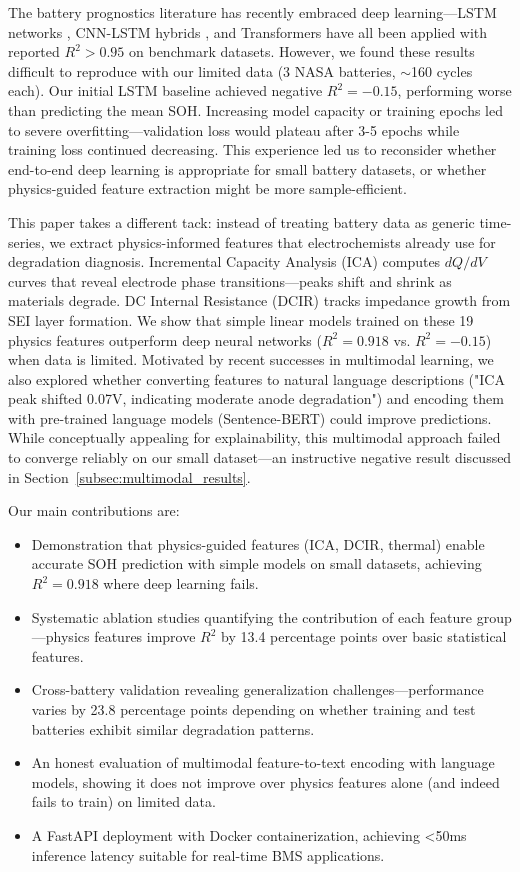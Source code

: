 \documentclass{sn-jnl}
\begin{document}
The battery prognostics literature has recently embraced deep learning—LSTM networks \citep{zhang2018}, CNN-LSTM hybrids \citep{li2019}, and Transformers \citep{song2022} have all been applied with reported $R^2 > 0.95$ on benchmark datasets. However, we found these results difficult to reproduce with our limited data (3 NASA batteries, $\sim$160 cycles each). Our initial LSTM baseline achieved negative $R^2 = -0.15$, performing worse than predicting the mean SOH. Increasing model capacity or training epochs led to severe overfitting—validation loss would plateau after 3-5 epochs while training loss continued decreasing. This experience led us to reconsider whether end-to-end deep learning is appropriate for small battery datasets, or whether physics-guided feature extraction might be more sample-efficient.

This paper takes a different tack: instead of treating battery data as generic time-series, we extract physics-informed features that electrochemists already use for degradation diagnosis. Incremental Capacity Analysis (ICA) computes $dQ/dV$ curves that reveal electrode phase transitions—peaks shift and shrink as materials degrade. DC Internal Resistance (DCIR) tracks impedance growth from SEI layer formation. We show that simple linear models trained on these 19 physics features outperform deep neural networks ($R^2 = 0.918$ vs. $R^2 = -0.15$) when data is limited. Motivated by recent successes in multimodal learning, we also explored whether converting features to natural language descriptions ("ICA peak shifted 0.07V, indicating moderate anode degradation") and encoding them with pre-trained language models (Sentence-BERT) could improve predictions. While conceptually appealing for explainability, this multimodal approach failed to converge reliably on our small dataset—an instructive negative result discussed in Section~\ref{subsec:multimodal_results}.

Our main contributions are:

\begin{itemize}
    \item Demonstration that physics-guided features (ICA, DCIR, thermal) enable accurate SOH prediction with simple models on small datasets, achieving $R^2 = 0.918$ where deep learning fails.
    \item Systematic ablation studies quantifying the contribution of each feature group—physics features improve $R^2$ by 13.4 percentage points over basic statistical features.
    \item Cross-battery validation revealing generalization challenges—performance varies by 23.8 percentage points depending on whether training and test batteries exhibit similar degradation patterns.
    \item An honest evaluation of multimodal feature-to-text encoding with language models, showing it does not improve over physics features alone (and indeed fails to train) on limited data.
    \item A FastAPI deployment with Docker containerization, achieving <50ms inference latency suitable for real-time BMS applications.
\end{itemize}
\end{document}
